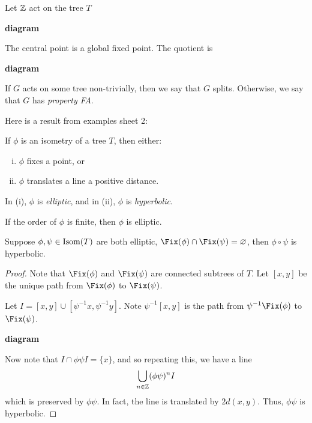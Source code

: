 \documentclass{article}
\begin{document}
\begin{example}
    Let \(\mathbb{Z}\) act on the tree \(T\)

    \textbf{diagram}

    The central point is a global fixed point. The quotient is

    \textbf{diagram}
\end{example}

If \(G\) acts on some tree non-trivially, then we say that \(G\) splits. Otherwise, we say that \(G\) has \emph{property FA}.

Here is a result from examples sheet 2:

\begin{lemma}
    If \(\phi\) is an isometry of a tree \(T\), then either:
    \begin{enumerate}[(i)]
        \item \(\phi\) fixes a point, or
        \item \(\phi\) translates a line a positive distance.
    \end{enumerate}
    In (i), \(\phi\) is \emph{elliptic}, and in (ii), \(\phi\) is \emph{hyperbolic}.
\end{lemma}

\begin{remark}
    If the order of \(\phi\) is finite, then \(\phi\) is elliptic.
\end{remark}

\begin{lemma}
    Suppose \(\phi, \psi \in \operatorname{Isom}(T)\) are both elliptic, \(\Fix(\phi) \cap \Fix(\psi) = \emptyset\), then \(\phi\circ\psi\) is hyperbolic.
\end{lemma}

\begin{proof}
    Note that \(\Fix(\phi)\) and \(\Fix(\psi)\) are connected subtrees of \(T\). Let \([x, y]\) be the unique path from \(\Fix(\phi)\) to \(\Fix(\psi)\).

    Let \(I = [x, y] \cup [\psi^{-1}x, \psi^{-1}y]\). Note \(\psi^{-1}[x, y]\) is the path from \(\psi^{-1}\Fix(\phi)\) to \(\Fix(\psi)\).

    \textbf{diagram}

    Now note that \(I \cap \phi\psi I = \{x\}\), and so repeating this, we have a line 
    \[\bigcup_{n \in \mathbb{Z}}(\phi\psi)^n I\]
    which is preserved by \(\phi\psi\). In fact, the line is translated by \(2d(x, y)\). Thus, \(\phi\psi\) is hyperbolic.
\end{proof}
\end{document}
